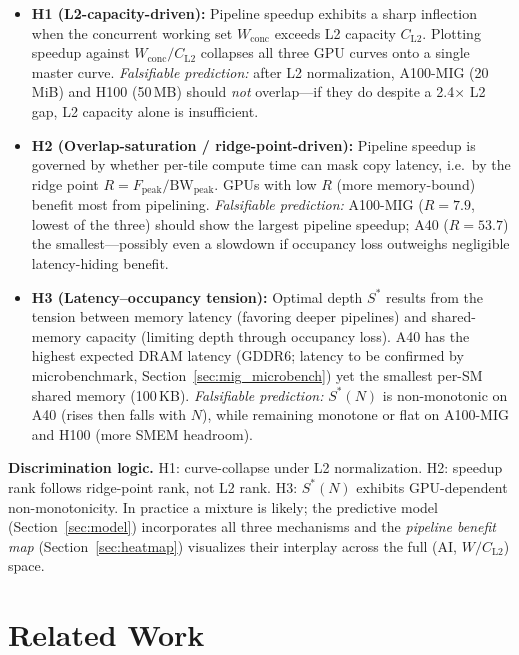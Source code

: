 \documentclass[sigplan,nonacm,10pt]{acmart}
\begin{document}
\begin{itemize}
\item \textbf{H1 (L2-capacity-driven):}
  Pipeline speedup exhibits a sharp inflection when the concurrent
  working set $W_{\text{conc}}$ exceeds L2 capacity $C_{\text{L2}}$.
  Plotting speedup against $W_{\text{conc}}/C_{\text{L2}}$ collapses
  all three GPU curves onto a single master curve.
  \emph{Falsifiable prediction:} after L2 normalization, A100-MIG
  (20\,MiB) and H100 (50\,MB) should \emph{not} overlap---if they do
  despite a 2.4$\times$ L2 gap, L2 capacity alone is insufficient.

\item \textbf{H2 (Overlap-saturation / ridge-point-driven):}
  Pipeline speedup is governed by whether per-tile compute time can mask
  copy latency, i.e.\ by the ridge point
  $R = F_{\text{peak}}/\text{BW}_{\text{peak}}$.
  GPUs with low $R$ (more memory-bound) benefit most from pipelining.
  \emph{Falsifiable prediction:} A100-MIG ($R = 7.9$, lowest of the
  three) should show the largest pipeline speedup; A40 ($R = 53.7$)
  the smallest---possibly even a slowdown if occupancy loss outweighs
  negligible latency-hiding benefit.

\item \textbf{H3 (Latency--occupancy tension):}
  Optimal depth $S^*$ results from the tension between memory latency
  (favoring deeper pipelines) and shared-memory capacity (limiting depth
  through occupancy loss).
  A40 has the highest expected DRAM latency (GDDR6; latency to be
  confirmed by microbenchmark, Section~\ref{sec:mig_microbench}) yet
  the smallest per-SM shared memory (100\,KB).
  \emph{Falsifiable prediction:} $S^*(N)$ is non-monotonic on A40
  (rises then falls with $N$), while remaining monotone or flat on
  A100-MIG and H100 (more SMEM headroom).
\end{itemize}

\noindent\textbf{Discrimination logic.}
H1: curve-collapse under L2 normalization.
H2: speedup rank follows ridge-point rank, not L2 rank.
H3: $S^*(N)$ exhibits GPU-dependent non-monotonicity.
In practice a mixture is likely; the predictive model
(Section~\ref{sec:model}) incorporates all three mechanisms and
the \emph{pipeline benefit map} (Section~\ref{sec:heatmap})
visualizes their interplay across the full (AI, $W/C_{\text{L2}}$)
space.

\section{Related Work}
\label{sec:related}
\end{document}
